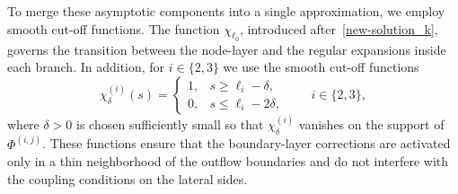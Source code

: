 \documentclass[reqno]{amsart}            %
\numberwithin{equation}{section}
\begin{document}
	To merge these asymptotic components into a single approximation, we employ smooth 
	cut-off functions.  
	The function $\chi_{\ell_0}$, introduced after~\eqref{new-solution_k}, governs the 
	transition between the node-layer and the regular expansions inside each branch.  
	In addition, for $i\in\{2,3\}$ we use the smooth cut-off functions
	\begin{equation}\label{cut-off_functions}
		\chi_\delta^{(i)}(s)=
		\begin{cases}
			1, & s\ge \ell_i-\delta,\\[2pt]
			0, & s\le \ell_i-2\delta,
		\end{cases}
		\qquad i\in\{2,3\},
	\end{equation}
	where $\delta>0$ is chosen sufficiently small so that $\chi_\delta^{(i)}$ vanishes on 
	the support of $\Phi^{(i,j)}$.  
	These functions ensure that the boundary-layer corrections are activated only in a 
	thin neighborhood of the outflow boundaries and do not interfere with the coupling 
	conditions on the lateral sides.
	
\end{document}
